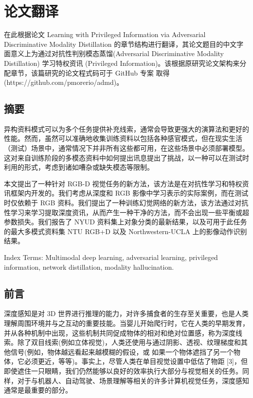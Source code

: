 \section{论文翻译}

在此根据论文 Learning with Privileged Information via Adversarial Discriminative Modality Distillation 的章节结构进行翻译，其论文题目的中文字面意义上为通过对抗性判别模态蒸馏(Adversarial Discriminative Modality Distillation) 学习特权资讯 (Privileged Information)。该根据原研究论文架构来分配章节，该篇研究的论文程式码可于 GitHub 专案
取得 (https://github.com/pmorerio/admd)。

\subsection{摘要}

异构资料模式可以为多个任务提供补充线索，通常会导致更强大的演算法和更好的性能。然而，虽然可以准确地收集训练资料以包括各种感官模式，但在现实生活（测试）场景中，通常情况下并非所有这些都可用，在这些场景中必须部署模型。这对来自训练阶段的多模态资料中如何提出讯息提出了挑战，以一种可以在测试时利用的形式，考虑到诸如嘈杂或缺失模态等限制。

本文提出了一种针对 RGB-D 视觉任务的新方法，该方法是在对抗性学习和特权资讯框架内开发的。我们考虑从深度和 RGB 影像中学习表示的实际案例，而在测试时仅依赖于 RGB 资料。我们提出了一种训练幻觉网络的新方法，该方法通过对抗性学习来学习提取深度资讯，从而产生一种干净的方法，而不会出现一些平衡或超参数损失。我们报告了 NYUD 资料集上对象分类的最新结果，以及可用于此任务的最大多模式资料集 NTU RGB+D 以及 Northwestern-UCLA 上的影像动作识别结果。

Index Terms: Multimodal deep learning, adversarial learning, privileged information, network distillation, modality hallucination.

\subsection{前言}

深度感知是对 3D 世界进行推理的能力，对许多捕食者的生存至关重要，也是人类理解周围环境并与之互动的重要技能。当婴儿开始爬行时，它在人类的早期发育，并从各种机制中出现，这些机制共同促成物体的相对和绝对位置感，称为深度线索。除了双目线索(例如立体视觉)，人类还使用与通过阴影、透视、纹理梯度和其他信号(例如，物体越远看起来越模糊的假设，或 如果一个物体遮挡了另一个物体，它必须更近，等等)。事实上，尽管人类在单目视觉设置中低估了物距 [3]，但即使遮住一只眼睛，我们仍然能够以良好的效率执行大部分与视觉相关的任务。同样，对于与机器人、自动驾驶、场景理解等相关的许多计算机视觉任务，深度感知通常是最重要的部分。


